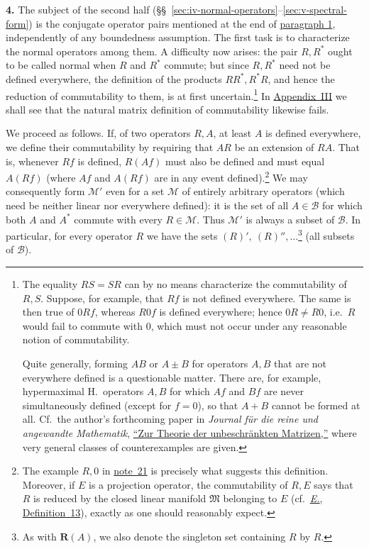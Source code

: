 \documentclass[
  paper=b5,
  twoside=true,
  fontsize=13pt,
  headings=normal,
  bookmarkpackage=false
]{scrartcl}
\theoremstyle{definition}
\newcommand{\NoteRef}[1]{\hyperref[fn:#1]{note~#1}}
\newcommand{\Eref}{\hyperref[fn:E-paper]{\emph{E.}}}
\newcommand{\ErefText}[1]{\href{https://doi.org/10.1007/BF01782338}{#1}}
\newcommand{\GeneratedRing}{\boldsymbol{R}}
\begin{document}
\medskip
{}
\noindent\textbf{4.}\label{intro:4}
The subject of the second half (\S\S~\ref{sec:iv-normal-operators}--\ref{sec:v-spectral-form}) is the conjugate operator pairs
mentioned at the end of \hyperref[intro:1]{paragraph 1}, independently of
any boundedness assumption. The first task is to characterize the normal
operators among them. A difficulty now arises: the pair $R,R^*$ ought to be
called normal when $R$ and $R^*$ commute; but since $R,R^*$ need not be
defined everywhere, the definition of the products $RR^*,R^*R$, and hence
the reduction of commutability to them, is at first
uncertain.\footnote{\label{fn:21}The equality $RS=SR$ can by no means characterize the
commutability of $R,S$. Suppose, for example, that $Rf$ is not defined
everywhere. The same is then true of $0Rf$, whereas $R0f$ is defined
everywhere; hence $0R\neq R0$, i.e.\ $R$ would fail to commute with $0$,
which must not occur under any reasonable notion of commutability.

Quite generally, forming $AB$ or $A\pm B$ for operators $A,B$ that are not
everywhere defined is a questionable matter. There are, for example,
hypermaximal H.\ operators $A,B$ for which $Af$ and $Bf$ are never
simultaneously defined (except for $f=0$), so that $A+B$ cannot be formed at
all. Cf.\ the author's forthcoming paper in \emph{Journal f\"ur die reine
und angewandte Mathematik}, \href{https://doi.org/10.1515/crll.1929.161.208}{``Zur Theorie der unbeschr\"ankten Matrizen,''}
where very general classes of counterexamples are given.} In
\hyperref[app:commutativity-unbounded]{Appendix~III}
we shall see that the natural matrix definition of commutability likewise
fails.

We proceed as follows. If, of two operators $R,A$, at least $A$ is defined
everywhere, we define their commutability by requiring that $AR$ be an
extension of $RA$. That is, whenever $Rf$ is defined, $R(Af)$ must also be
defined and must equal $A(Rf)$ (where $Af$ and $A(Rf)$ are in any event
defined).\footnote{\label{fn:22}The example $R,0$ in \NoteRef{21} is precisely what suggests
this definition. Moreover, if $E$ is a projection operator, the
commutability of $R,E$ says that $R$ is reduced by the closed linear
manifold $\mathfrak{M}$ belonging to $E$ (cf.\ \Eref, \ErefText{Definition~13}), exactly as one should
reasonably expect.} We may consequently form $\mathcal M'$ even for a set
$\mathcal M$ of entirely arbitrary operators (which need be neither linear
nor everywhere defined): it is the set of all $A\in\mathcal B$ for which
both $A$ and $A^*$ commute with every $R\in\mathcal M$. Thus
$\mathcal M'$ is always a subset of $\mathcal B$. In particular, for
every operator $R$ we have the sets $(R)',\ (R)'',\ldots$\footnote{\label{fn:23}%
As with $\GeneratedRing (A)$, we also denote the singleton set containing $R$ by $R$.}
(all subsets of $\mathcal B$).
\end{document}
